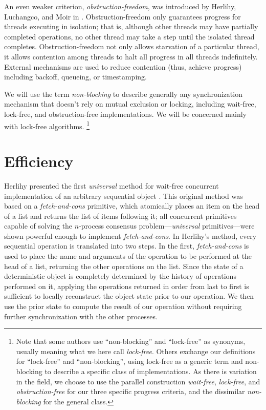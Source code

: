 An even weaker criterion, \emph{obstruction-freedom}, was introduced
by Herlihy, Luchangco, and Moir in \cite{HerlihyLuMo03}.
Obstruction-freedom only guarantees progress for threads executing in
isolation; that is, although other threads may have partially
completed operations, no other thread may take a step until the
isolated thread completes.  Obstruction-freedom not only allows
starvation of a particular thread, it allows contention among threads
to halt all progress in all threads
indefinitely.  External mechanisms are used to reduce contention
(thus, achieve progress) including backoff, queueing, or timestamping.

We will use the term \emph{non-blocking} to describe
generally any synchronization mechanism that doesn't rely on mutual
exclusion or locking, including wait-free, lock-free,
and obstruction-free implementations.
We will be concerned mainly with lock-free algorithms.%
\footnote{Note that some authors use ``non-blocking'' and
  ``lock-free'' as synonyms, usually meaning what we here call
  \emph{lock-free}.  Others exchange our definitions for ``lock-free''
  and ``non-blocking'', using lock-free as a generic term and non-blocking
  to describe a specific class of implementations.  As there is
  variation in the field, we choose to use the parallel construction
  \emph{wait-free}, \emph{lock-free}, and \emph{obstruction-free} for
  our three specific progress criteria, and the dissimilar
  \emph{non-blocking} for the general class.}

\section{Efficiency}\label{sec:efficiency}
Herlihy presented the first \emph{universal} method for wait-free
concurrent implementation of an arbitrary sequential object
\cite{Herlihy88,Herlihy91}.  This original method was based on
a \emph{fetch-and-cons} primitive, which atomically places
an item on the head of a list and returns the list of items following
it; all concurrent primitives capable of solving the
$n$-process consensus problem---\emph{universal} primitives---were
shown powerful enough to implement \emph{fetch-and-cons}.
In Herlihy's method, 
every sequential operation is translated into two steps.  In the first,
\emph{fetch-and-cons} is used to place the name and arguments of the
operation to be performed
at the head of a list, returning the other operations on the list.
Since the state
of a deterministic object is completely determined by the history of
operations performed on it, applying the operations returned
in order from last to first is sufficient to locally reconstruct the
object state 
prior to our operation.
We then use the prior state to compute the result of our operation
without requiring further synchronization with the other processes.

